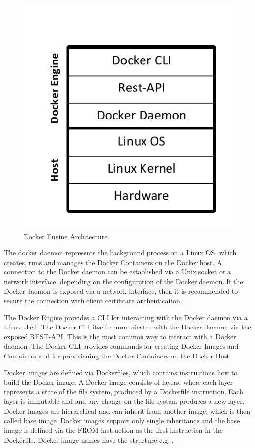 \begin{figure}[htbp]
	\centering
	\includegraphics[scale=0.8]{images/docker-engine.pdf}
	\caption{Docker Engine Architecture}
	\label{fig:docker-engine}
\end{figure} 

\label{sec:docker-daemon}
The docker daemon represents the background process on a Linux OS, which creates, runs and manages the Docker Containers on the Docker host. A connection to the Docker daemon can be established via a Unix socket or a network interface, depending on the configuration of the Docker daemon. If the Docker daemon is exposed via a network interface, then it is recommended to secure the connection with client certificate authentication.

The Docker Engine provides a CLI for interacting with the Docker daemon via a Linux shell. The Docker CLI itself communicates with the Docker daemon via the exposed REST-API. This is the most common way to interact with a Docker daemon. The Docker CLI provides commands for creating Docker Images and Containers and for provisioning the Docker Containers on the Docker Host.

\label{sec:docker-images}
Docker images are defined via Dockerfiles, which contains instructions how to build the Docker image. A Docker image consists of layers, where each layer represents a state of the file system, produced by a Dockerfile instruction. Each layer is immutable and and any change on the file system produces a new layer. Docker Images are hierarchical and can inherit from another image, which is then called base image. Docker images support only single inheritance and the base image is defined via the FROM instruction as the first instruction in the Dockerfile. Docker image names have the structure \mentionedtext{[namespace]/[name]:[version]} e.g. .

